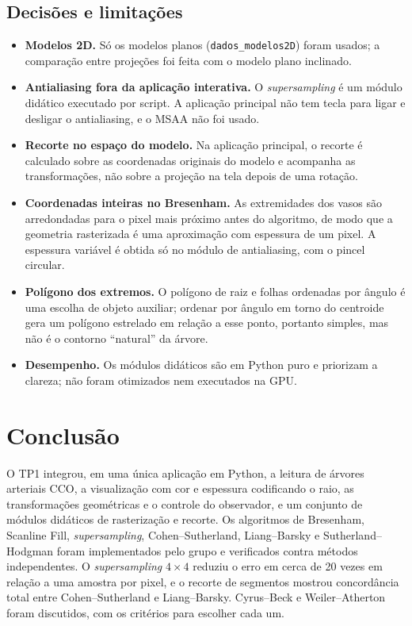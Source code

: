 \documentclass[11pt, a4paper]{article}
\begin{document}
\subsection{Decisões e limitações}
\begin{itemize}[leftmargin=*]
  \item \textbf{Modelos 2D.} Só os modelos planos (\texttt{dados\_modelos2D}) foram usados; a comparação entre projeções foi feita com o modelo plano inclinado. 
  \item \textbf{Antialiasing fora da aplicação interativa.} O \emph{supersampling} é um módulo didático executado por script. A aplicação principal não tem tecla para ligar e desligar o antialiasing, e o MSAA não foi usado.
  \item \textbf{Recorte no espaço do modelo.} Na aplicação principal, o recorte é calculado sobre as coordenadas originais do modelo e acompanha as transformações, não sobre a projeção na tela depois de uma rotação.
  \item \textbf{Coordenadas inteiras no Bresenham.} As extremidades dos vasos são arredondadas para o pixel mais próximo antes do algoritmo, de modo que a geometria rasterizada é uma aproximação com espessura de um pixel. A espessura variável é obtida só no módulo de antialiasing, com o pincel circular.
  \item \textbf{Polígono dos extremos.} O polígono de raiz e folhas ordenadas por ângulo é uma escolha de objeto auxiliar; ordenar por ângulo em torno do centroide gera um polígono estrelado em relação a esse ponto, portanto simples, mas não é o contorno ``natural'' da árvore.
  \item \textbf{Desempenho.} Os módulos didáticos são em Python puro e priorizam a clareza; não foram otimizados nem executados na GPU.
\end{itemize}

\section{Conclusão}
O TP1 integrou, em uma única aplicação em Python, a leitura de árvores arteriais CCO, a visualização com cor e espessura codificando o raio, as transformações geométricas e o controle do observador, e um conjunto de módulos didáticos de rasterização e recorte. Os algoritmos de Bresenham, Scanline Fill, \emph{supersampling}, Cohen--Sutherland, Liang--Barsky e Sutherland--Hodgman foram implementados pelo grupo e verificados contra métodos independentes. O \emph{supersampling} $4\times4$ reduziu o erro em cerca de 20 vezes em relação a uma amostra por pixel, e o recorte de segmentos mostrou concordância total entre Cohen--Sutherland e Liang--Barsky. Cyrus--Beck e Weiler--Atherton foram discutidos, com os critérios para escolher cada um.
\end{document}
